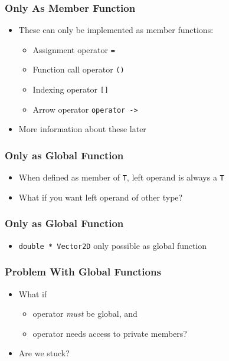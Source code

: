 \begin{frame}
  \frametitle{Only As Member Function}
  \begin{itemize}
    \item These can only be implemented as member functions:
          \begin{itemize}
            \item Assignment operator \texttt{=}
            \item Function call operator \texttt{()}
            \item Indexing operator \texttt{[]}
            \item Arrow operator \texttt{operator ->}
          \end{itemize}
    \item More information about these later
  \end{itemize}
\end{frame}

\begin{frame}
  \frametitle{Only as Global Function}
  \begin{itemize}
    \item When defined as member of \texttt{T}, left operand is always a \texttt{T}
    \item What if you want left operand of other type?
  \end{itemize}
\end{frame}

\begin{frame}
  \frametitle{Only as Global Function}
  \begin{itemize}
    \item \texttt{double * Vector2D} only possible as global function
  \end{itemize}
\end{frame}

\begin{frame}
  \frametitle{Problem With Global Functions}
  \begin{itemize}
    \item What if
          \begin{itemize}
            \item operator \emph{must} be global, and
            \item operator needs access to private members?
          \end{itemize}
    \item Are we stuck?
  \end{itemize}
\end{frame}

